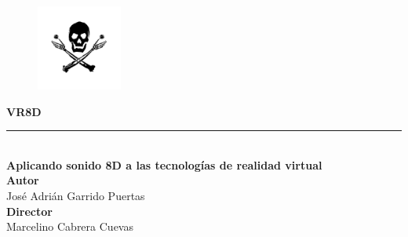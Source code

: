 
\centering

\vspace{3.3cm}
\begin{figure}[htb]
	\centering
	\includegraphics[width=0.25\textwidth]{./imagenes/logo.png}
\end{figure}
\vspace{0.5cm}
{\Huge\bfseries VR8D\\}
\noindent\rule[-1ex]{\textwidth}{3pt}\\[3.5ex]
{\large\bfseries Aplicando sonido 8D a las tecnologías de realidad virtual\\[4cm]}
\textbf{Autor}\\ {José Adrián Garrido Puertas}\\[1.0ex]
\textbf{Director}\\ {Marcelino Cabrera Cuevas}\\[0.5cm]